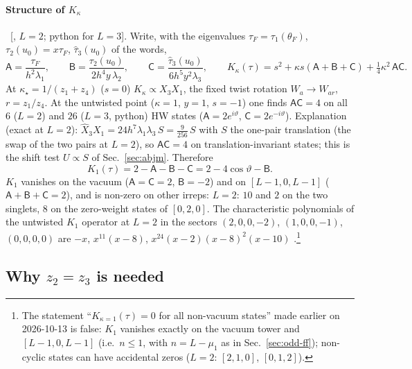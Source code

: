 \paragraph{Structure of $K_\kappa$} \ex\ [, $L=2$; python for $L=3$]. Write, with the eigenvalues $\tau_F=\tau_1(\theta_F)$, $\tau_2(u_0)=x\tau_F$, $\hat\tau_3(u_0)$ of the words,
\begin{equation}\label{eq:kappa-ABC}
 \mathsf A=\frac{\tau_F}{h^2\lambda_1},\qquad \mathsf B=\frac{\tau_2(u_0)}{2h^4y\,\lambda_2},\qquad \mathsf C=\frac{\hat\tau_3(u_0)}{6h^5y^2\lambda_3},\qquad
 K_\kappa(\tau)=s^2+\kappa s(\mathsf A+\mathsf B+\mathsf C)+\tfrac14\kappa^2\,\mathsf A\mathsf C .
\end{equation}
At $\kappa_\star=1/(z_1+z_4)$ ($s=0$) $K_\kappa\propto X_3X_1$, the fixed twist rotation $W_a\to W_{ar}$, $r=z_1/z_4$. At the untwisted point ($\kappa=1$, $y=1$, $s=-1$) one finds $\mathsf A\mathsf C=4$ on all $6$ ($L=2$) and $26$ ($L=3$, python) HW states
($\mathsf A=2e^{i\vartheta}$, $\mathsf C=2e^{-i\vartheta}$). Explanation (exact at $L=2$): $\hat X_3X_1=24h^7\lambda_1\lambda_3\,S=\tfrac9{256}\,S$ with $S$ the one-pair translation (the swap of the two pairs at $L=2$), so $\mathsf A\mathsf C=4$ on translation-invariant states;
this is the shift test $U\propto S$ of Sec.~\ref{sec:abjm}. Therefore
\begin{equation}
 K_1(\tau)=2-\mathsf A-\mathsf B-\mathsf C=2-4\cos\vartheta-\mathsf B .
\end{equation}
$K_1$ vanishes on the vacuum ($\mathsf A=\mathsf C=2$, $\mathsf B=-2$) and on $[L-1,0,L-1]$ ($\mathsf A+\mathsf B+\mathsf C=2$), and is non-zero on other irreps: $L=2$: $10$ and $2$ on the two singlets, $8$ on the zero-weight states of $[0,2,0]$. The characteristic
polynomials of the untwisted $K_1$ operator at $L=2$ in the sectors $(2,0,0,-2)$, $(1,0,0,-1)$, $(0,0,0,0)$ are $-x$, $x^{11}(x-8)$, $x^{24}(x-2)(x-8)^2(x-10)$ \ex.\footnote{The statement ``$K_{\kappa=1}(\tau)=0$ for all non-vacuum states'' made earlier on 2026-10-13 is false:
$K_1$ vanishes exactly on the vacuum tower and $[L-1,0,L-1]$ (i.e.\ $n\le1$, with $n=L-\mu_1$ as in Sec.~\ref{sec:odd-ff}); non-cyclic states can have accidental zeros ($L=2$: $[2,1,0]$, $[0,1,2]$).}

\subsection{Why $z_2=z_3$ is needed}\label{sec:kappa-z2z3}

